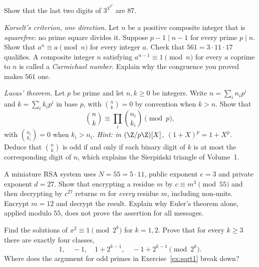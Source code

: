 \begin{exercise}[$\star\star$]\label{ex:tower}
Show that the last two digits of $3^{3^{3^3}}$ are $87$.
\end{exercise}

\begin{exercise}[$\star\star$]\label{ex:korselt}
\emph{Korselt's criterion, one direction.} Let $n$ be a positive composite integer that is \emph{squarefree}: no prime square divides it. Suppose $p-1\mid n-1$ for every prime $p\mid n$. Show that $a^n\equiv a\pmod n$ for every integer $a$. Check that $561=3\cdot11\cdot17$ qualifies. A composite integer $n$ satisfying $a^{n-1}\equiv1\pmod n$ for every $a$ coprime to $n$ is called a \emph{Carmichael number}. Explain why the congruence you proved makes $561$ one.
\end{exercise}

\begin{exercise}[$\star\star\star$]\label{ex:lucas}
\emph{Lucas' theorem.} Let $p$ be prime and let $n,k\ge0$ be integers. Write $n=\sum_in_ip^i$ and $k=\sum_ik_ip^i$ in base $p$, with $\binom nk=0$ by convention when $k>n$. Show that
\[
\binom nk\equiv\prod_i\binom{n_i}{k_i}\pmod p,
\]
with $\binom{n_i}{k_i}=0$ when $k_i>n_i$. \emph{Hint: in $(\Z/p\Z)[X]$, $(1+X)^p=1+X^p$.} Deduce that $\binom nk$ is odd if and only if each binary digit of $k$ is at most the corresponding digit of $n$, which explains the Sierpi\'nski triangle of Volume~1.
\end{exercise}

\begin{exercise}[$\star\star$]\label{ex:t1-toy-rsa}
A miniature RSA system uses $N=55=5\cdot11$, public exponent $e=3$ and private exponent $d=27$. Show that encrypting a residue $m$ by $c\equiv m^3\pmod{55}$ and then decrypting by $c^{27}$ returns $m$ for \emph{every} residue $m$, including non-units. Encrypt $m=12$ and decrypt the result. Explain why Euler's theorem alone, applied modulo $55$, does not prove the assertion for all messages.
\end{exercise}

\begin{exercise}[$\star\star\star$]\label{ex:t1-two-power-roots}
Find the solutions of $x^2\equiv1\pmod{2^k}$ for $k=1,2$. Prove that for every $k\ge3$ there are exactly four classes,
\[
1,\quad -1,\quad 1+2^{k-1},\quad -1+2^{k-1}\pmod{2^k}.
\]
Where does the argument for odd primes in Exercise~\ref{ex:sqrt1} break down?
\end{exercise}


